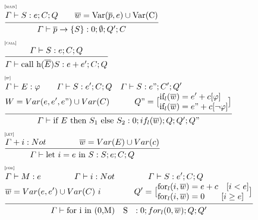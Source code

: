 \documentclass[../../main.tex]{subfiles}
\begin{document}
\begin{align}
    &\begin{array}{l} \mbox{\tiny [{\sc main}]} \\ \frac{^{\textstyle 
        \begin{aligned} \varGamma \vdash S : e ; C; Q  \quad \quad
        \overline{w} = \text{Var}(\overline{p},e) \cup \text{Var(C)}
        \end{aligned}
        }}{_{\textstyle \varGamma \vdash \overline{p}  \rightarrow \{S\}: 0 ;\emptyset;Q';C}} \end{array} \\
    &\begin{array}{l} \mbox{\tiny [{\sc call}]} \\ \frac{^{\textstyle \varGamma \vdash S : e ; C; Q}}{_{\textstyle \varGamma \vdash \text{call h}(\overline{E}) S : e + e' ; C; Q}} \end{array}\\
    &\begin{array}{l} \mbox{\tiny [{\sc if}]} \\ \frac{^{\textstyle 
    \begin{aligned}
        &\varGamma \vdash E : \varphi  \quad \quad \varGamma \vdash S : e'; C; Q \quad \varGamma \vdash S : e"; C'; Q'\\
        &W = Var(e, e', e") \cup Var(C) \quad \quad \quad Q" =\big[ \begin{aligned}
            &\text{if}_l(\overline{w})  = e'+c[\varphi]\\
            &\text{if}_l(\overline{w})  = e"+c[\neg \varphi]\\
        \end{aligned}\big] \\
    \end{aligned}    
    }}{_{\textstyle \varGamma \vdash \text{if } E \text{ then } S_1 \text{ else } S_2 : 0; if_l(\overline{w}); Q; Q'; Q"}} \end{array}\\
    &\begin{array}{l} \mbox{\tiny [{\sc let}]} \\ \frac{^{\textstyle \varGamma + i : Not \quad \quad \quad \quad \overline{w} = Var(E) \cup Var(c)}}{_{\textstyle \varGamma \vdash \text{let } i = e \text{ in } S : S;e ; C; Q}} \end{array}\\
    &\begin{array}{l} \mbox{\tiny [{\sc for}]} \\ \frac{^{\textstyle 
        \begin{aligned}
            &\varGamma \vdash M: e \quad \quad \quad \quad \varGamma \vdash i : Not\quad \quad \quad \quad \varGamma \vdash S : e'; C; Q\\
            &\overline{w} = Var(e, e') \cup Var(C) \ i \quad \quad \quad \quad Q' = \big[ \begin{aligned}
                &\text{for}_l(i,\overline{w}) = e + c\quad [i < e]\\
                &\text{for}_l(i,\overline{w}) = 0 \quad \quad [i \geq e]\\
            \end{aligned}\big]
        \end{aligned}
    }}{_{\textstyle \varGamma \vdash \text{for i in (0,M) } \text{ { S } } : 0; for_l(0,\overline{w}); Q; Q'}} \end{array}
\end{align}
\end{document}
